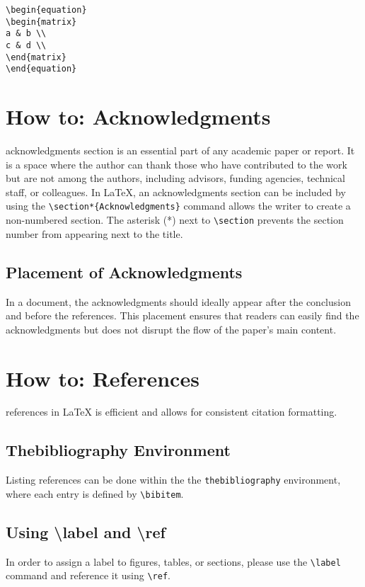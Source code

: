 \documentclass[12pt,journal,compsoc]{IEEEtran}
\begin{document}
\begin{verbatim}
\begin{equation}
\begin{matrix}
a & b \\
c & d \\
\end{matrix}
\end{equation}
\end{verbatim}

\section{How to: Acknowledgments}
 acknowledgments section is an essential part of any academic paper or report. It is a space where the author can thank those who have contributed to the work but are not among the authors, including advisors, funding agencies, technical staff, or colleagues. In \LaTeX, an acknowledgments section can be included by using the \texttt{\textbackslash section*\{Acknowledgments\}} command allows the writer to create a non-numbered section. The asterisk (*) next to \texttt{\textbackslash section} prevents the section number from appearing next to the title.

\subsection*{Placement of Acknowledgments}
In a document, the acknowledgments should ideally appear after the conclusion and before the references. This placement ensures that readers can easily find the acknowledgments but does not disrupt the flow of the paper's main content.

\section{How to: References}
 references in \LaTeX{} is efficient and allows for consistent citation formatting.  

\subsection{Thebibliography Environment}
Listing references can be done within the the \texttt{thebibliography} environment, where each entry is defined by \texttt{\textbackslash bibitem}. 

\subsection{Using \textbackslash label and \textbackslash ref}
In order to assign a label to figures, tables, or sections, please use the \texttt{\textbackslash label} command and reference it using \texttt{\textbackslash ref}.
\end{document}
